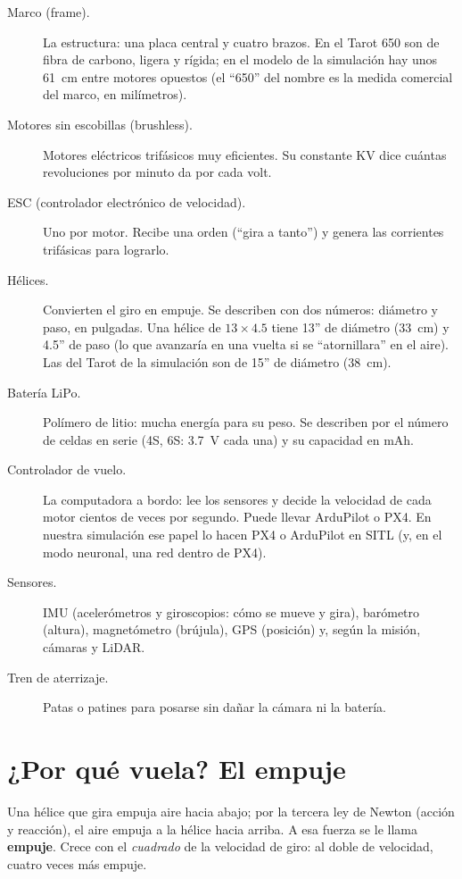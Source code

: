 \begin{description}
  \item[Marco (frame).] La estructura: una placa central y cuatro brazos. En el Tarot 650 son de fibra
        de carbono, ligera y rígida; en el modelo de la simulación hay unos 61~cm entre motores opuestos
        (el ``650'' del nombre es la medida comercial del marco, en milímetros).
  \item[Motores sin escobillas (brushless).] Motores eléctricos trifásicos muy eficientes. Su constante
        KV dice cuántas revoluciones por minuto da por cada volt.
  \item[ESC (controlador electrónico de velocidad).] Uno por motor. Recibe una orden (``gira a tanto'')
        y genera las corrientes trifásicas para lograrlo.
  \item[Hélices.] Convierten el giro en empuje. Se describen con dos números: diámetro y paso, en
        pulgadas. Una hélice de $13\times4.5$ tiene 13'' de diámetro (33~cm) y 4.5'' de paso (lo que
        avanzaría en una vuelta si se ``atornillara'' en el aire). Las del Tarot de la simulación son de
        15'' de diámetro (38~cm).
  \item[Batería LiPo.] Polímero de litio: mucha energía para su peso. Se describen por el número de
        celdas en serie (4S, 6S: 3.7~V cada una) y su capacidad en mAh.
  \item[Controlador de vuelo.] La computadora a bordo: lee los sensores y decide la velocidad de cada
        motor cientos de veces por segundo. Puede llevar ArduPilot o PX4. En nuestra simulación ese
        papel lo hacen PX4 o ArduPilot en SITL (y, en el modo neuronal, una red dentro de PX4).
  \item[Sensores.] IMU (acelerómetros y giroscopios: cómo se mueve y gira), barómetro (altura),
        magnetómetro (brújula), GPS (posición) y, según la misión, cámaras y LiDAR.
  \item[Tren de aterrizaje.] Patas o patines para posarse sin dañar la cámara ni la batería.
\end{description}

\section{¿Por qué vuela? El empuje}

Una hélice que gira empuja aire hacia abajo; por la tercera ley de Newton (acción y reacción), el
aire empuja a la hélice hacia arriba. A esa fuerza se le llama \textbf{empuje}. Crece con el
\emph{cuadrado} de la velocidad de giro: al doble de velocidad, cuatro veces más empuje.

